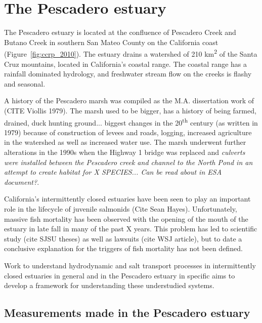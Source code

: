 \chapter{The Pescadero estuary} \label{chPescadero}

The Pescadero estuary is located at the confluence of Pescadero Creek and Butano Creek in southern San Mateo County on the California coast (Figure~\ref{fig:ccrp_2010}). The estuary drains a watershed of 210 km\textsuperscript{2} of the Santa Cruz mountains, located in California's coastal range. The coastal range has a rainfall dominated hydrology, and freshwater stream flow on the creeks is flashy and seasonal.



A history of the Pescadero marsh was compiled as the M.A. dissertation work of (CITE Viollis 1979). The marsh used to be bigger, has a history of being farmed, drained, duck hunting ground... biggest changes in the 20\textsuperscript{th} century (as written in 1979) because of construction of levees and roads, logging, increased agriculture in the watershed as well as increased water use. The marsh underwent further alterations in the 1990s when the Highway 1 bridge was replaced and \emph{culverts were installed between the Pescadero creek and channel to the North Pond in an attempt to create habitat for X SPECIES... Can be read about in ESA document?}.

California's intermittently closed estuaries have been seen to play an important role in the lifecycle of juvenile salmonids (Cite Sean Hayes). Unfortunately, massive fish mortality has been observed with the opening of the mouth of the estuary in late fall in many of the past X years. This problem has led to scientific study (cite SJSU theses) as well as lawsuits (cite WSJ article), but to date a conclusive explanation for the triggers of fish mortality has not been defined. 

Work to understand hydrodynamic and salt transport processes in intermittently closed estuaries in general and in the Pescadero estuary in specific aims to develop a framework for understanding these understudied systems. 

\section{Measurements made in the Pescadero estuary} \label{measurementslabel}


